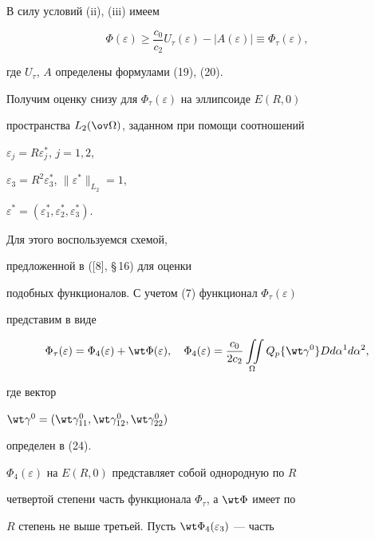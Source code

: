 \begin{pf} 


В силу условий (ii), (iii) имеем 


\begin{equation} 


\Phi(\varepsilon)\ge\frac{c_0}{c_2}U_\tau(\varepsilon)- 


|A(\varepsilon)|\equiv \Phi_\tau(\varepsilon), 


\end{equation} 


где $U_\tau$, $A$ определены формулами (19), (20). 


Получим оценку снизу для $\Phi_\tau(\varepsilon)$ на эллипсоиде $E(R,0)$ 


пространства $L_2(\ov\Omega)$, заданном при помощи соотношений 


$\varepsilon_j=R\varepsilon^*_j$, $j=1,2$, 


$\varepsilon_3=R^2\varepsilon^*_3$, $\|\varepsilon^*\|_{L_2}=1$, 


$\varepsilon^*=(\varepsilon^*_1,\varepsilon^*_2,\varepsilon^*_3)$. 


Для этого воспользуемся схемой, 


предложенной в ([8], \S\,16) для оценки 


подобных функционалов. С учетом (7) функционал $\Phi_\tau(\varepsilon)$ 


представим в виде 


\begin{equation} 


\Phi_\tau(\varepsilon)=\Phi_4(\varepsilon)+ 


\wt\Phi(\varepsilon),\quad \Phi_4(\varepsilon)= 


\frac{c_0}{2c_2}\iint\limits_\Omega Q_p 


\{\wt \gamma^0\}D d\alpha^1d\alpha^2, 


\end{equation} 


где вектор 


$\wt\gamma^0=(\wt\gamma^0_{11},\wt\gamma^0_{12},\wt\gamma^0_{22})$ 


определен в (24). 


$\Phi_4(\varepsilon)$ на $E(R,0)$ представляет собой однородную по $R$ 


четвертой степени часть функционала $\Phi_\tau$, а $\wt\Phi$ имеет по 


$R$ степень не выше третьей. Пусть $\wt\Phi_4(\varepsilon_3)$ --- часть 



\end{pf}
